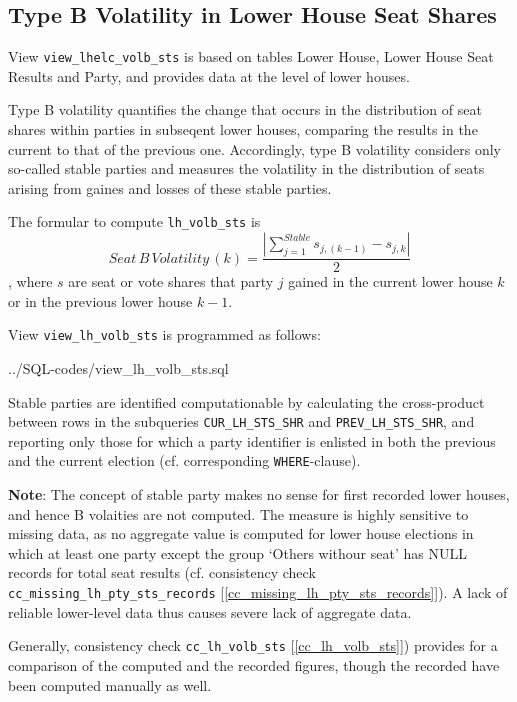 \subsection{Type B Volatility in Lower House Seat Shares}\label{view_lh_volb_sts}
View \texttt{\footnotesize view\_lhelc\_volb\_sts} is based on tables Lower House, Lower House Seat Results and Party, and provides data at the level of lower houses.

Type B volatility quantifies the change that occurs in the distribution of seat shares within parties in subseqent lower houses, comparing the results in the current to that of the previous one. 
Accordingly, type B volatility considers only so-called stable parties and measures the  volatility in the distribution of seats arising from gaines and losses of these stable parties.	

The formular to compute \texttt{\footnotesize lh\_volb\_sts} is
\begin{equation}
Seat\,B\,Volatility\,(k) = \frac{ | \sum\limits_{j=1}^{Stable} s_{j,(k-1)} - s_{j,k}| }{2}
\end{equation}, where $s$ are seat or vote shares that party $j$ gained in the current lower house $k$ or in the previous lower house $k-1$.


View \texttt{\footnotesize view\_lh\_volb\_sts} is programmed as follows:

%
{../SQL-codes/view_lh_volb_sts.sql}

Stable parties are identified computationable by calculating the cross-product between rows in the subqueries 
\texttt{\footnotesize CUR\_LH\_STS\_SHR} and \texttt{\footnotesize PREV\_LH\_STS\_SHR}, and reporting only those for which a party identifier is enlisted in both the previous and the current election (cf. corresponding \texttt{\footnotesize WHERE}-clause). 

{\bf Note}: The concept of stable party makes no sense for first recorded lower houses, and hence B volaities are not computed. 
The measure is highly sensitive to missing data, as no aggregate value is computed for lower house  elections in which at least one party except the group `Others withour seat' has NULL records for total seat results (cf. consistency check \texttt{\footnotesize cc\_missing\_lh\_pty\_sts\_records} [\ref{cc_missing_lh_pty_sts_records}]). A lack of reliable lower-level data thus causes severe lack of aggregate data. 

Generally, consistency check \texttt{\footnotesize cc\_lh\_volb\_sts} [\ref{cc_lh_volb_sts}]) provides for a comparison of the computed and the recorded figures, though the recorded have been computed manually as well.

